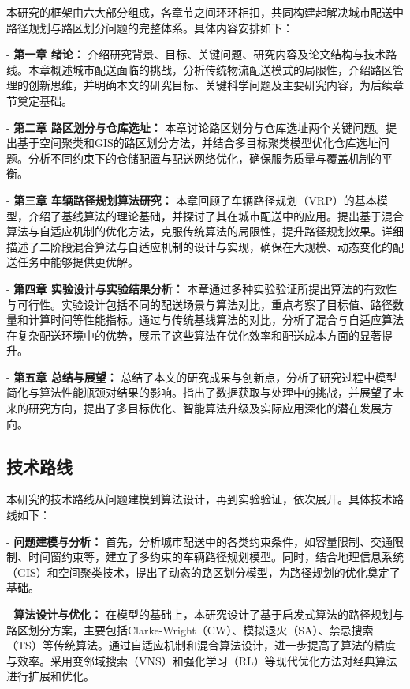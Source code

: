\documentclass[12pt,a4paper,twoside]{ctexbook}
\begin{document}
本研究的框架由六大部分组成，各章节之间环环相扣，共同构建起解决城市配送中路径规划与路区划分问题的完整体系。具体内容安排如下：

- \textbf{第一章 绪论：} 介绍研究背景、目标、关键问题、研究内容及论文结构与技术路线。本章概述城市配送面临的挑战，分析传统物流配送模式的局限性，介绍路区管理的创新思维，并明确本文的研究目标、关键科学问题及主要研究内容，为后续章节奠定基础。

- \textbf{第二章 路区划分与仓库选址：} 本章讨论路区划分与仓库选址两个关键问题。提出基于空间聚类和GIS的路区划分方法，并结合多目标聚类模型优化仓库选址问题。分析不同约束下的仓储配置与配送网络优化，确保服务质量与覆盖机制的平衡。

- \textbf{第三章 车辆路径规划算法研究：} 本章回顾了车辆路径规划（VRP）的基本模型，介绍了基线算法的理论基础，并探讨了其在城市配送中的应用。提出基于混合算法与自适应机制的优化方法，克服传统算法的局限性，提升路径规划效果。详细描述了二阶段混合算法与自适应机制的设计与实现，确保在大规模、动态变化的配送任务中能够提供更优解。

- \textbf{第四章 实验设计与实验结果分析：} 本章通过多种实验验证所提出算法的有效性与可行性。实验设计包括不同的配送场景与算法对比，重点考察了目标值、路径数量和计算时间等性能指标。通过与传统基线算法的对比，分析了混合与自适应算法在复杂配送环境中的优势，展示了这些算法在优化效率和配送成本方面的显著提升。

- \textbf{第五章 总结与展望：} 总结了本文的研究成果与创新点，分析了研究过程中模型简化与算法性能瓶颈对结果的影响。指出了数据获取与处理中的挑战，并展望了未来的研究方向，提出了多目标优化、智能算法升级及实际应用深化的潜在发展方向。

\subsection{技术路线}

本研究的技术路线从问题建模到算法设计，再到实验验证，依次展开。具体技术路线如下：

- \textbf{问题建模与分析：} 首先，分析城市配送中的各类约束条件，如容量限制、交通限制、时间窗约束等，建立了多约束的车辆路径规划模型。同时，结合地理信息系统（GIS）和空间聚类技术，提出了动态的路区划分模型，为路径规划的优化奠定了基础。

- \textbf{算法设计与优化：} 在模型的基础上，本研究设计了基于启发式算法的路径规划与路区划分方案，主要包括Clarke-Wright（CW）、模拟退火（SA）、禁忌搜索（TS）等传统算法。通过自适应机制和混合算法设计，进一步提高了算法的精度与效率。采用变邻域搜索（VNS）和强化学习（RL）等现代优化方法对经典算法进行扩展和优化。
\end{document}
